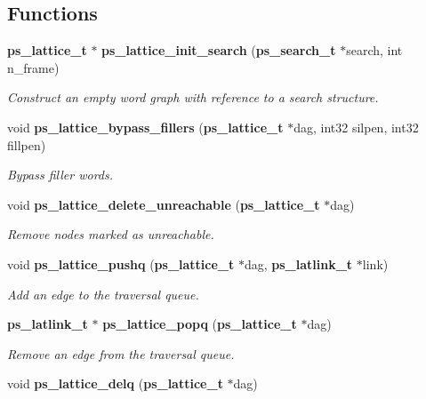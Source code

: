\subsection*{Functions}
\begin{DoxyCompactItemize}
\item 
{\bf ps\-\_\-lattice\-\_\-t} $\ast$ {\bf ps\-\_\-lattice\-\_\-init\-\_\-search} ({\bf ps\-\_\-search\-\_\-t} $\ast$search, int n\-\_\-frame)\label{ps__lattice__internal_8h_a606f6ee0fd569dd5829d7f84ae7e61bd}

\begin{DoxyCompactList}\small\item\em Construct an empty word graph with reference to a search structure. \end{DoxyCompactList}\item 
void {\bf ps\-\_\-lattice\-\_\-bypass\-\_\-fillers} ({\bf ps\-\_\-lattice\-\_\-t} $\ast$dag, int32 silpen, int32 fillpen)\label{ps__lattice__internal_8h_a9b40adaa059978fe33959d59da1b6919}

\begin{DoxyCompactList}\small\item\em Bypass filler words. \end{DoxyCompactList}\item 
void {\bf ps\-\_\-lattice\-\_\-delete\-\_\-unreachable} ({\bf ps\-\_\-lattice\-\_\-t} $\ast$dag)\label{ps__lattice__internal_8h_a6da4e36322aaab4d2ebe812bee9a4439}

\begin{DoxyCompactList}\small\item\em Remove nodes marked as unreachable. \end{DoxyCompactList}\item 
void {\bf ps\-\_\-lattice\-\_\-pushq} ({\bf ps\-\_\-lattice\-\_\-t} $\ast$dag, {\bf ps\-\_\-latlink\-\_\-t} $\ast$link)\label{ps__lattice__internal_8h_a04896ebe0e2592bc7950d413b5d5c52e}

\begin{DoxyCompactList}\small\item\em Add an edge to the traversal queue. \end{DoxyCompactList}\item 
{\bf ps\-\_\-latlink\-\_\-t} $\ast$ {\bf ps\-\_\-lattice\-\_\-popq} ({\bf ps\-\_\-lattice\-\_\-t} $\ast$dag)\label{ps__lattice__internal_8h_a481c4d941368597e11b0af4709bd03b0}

\begin{DoxyCompactList}\small\item\em Remove an edge from the traversal queue. \end{DoxyCompactList}\item 
void {\bf ps\-\_\-lattice\-\_\-delq} ({\bf ps\-\_\-lattice\-\_\-t} $\ast$dag)\label{ps__lattice__internal_8h_ad128ca75e8bc7ca4ba41094fb5b68ee9}


\end{DoxyCompactItemize}

